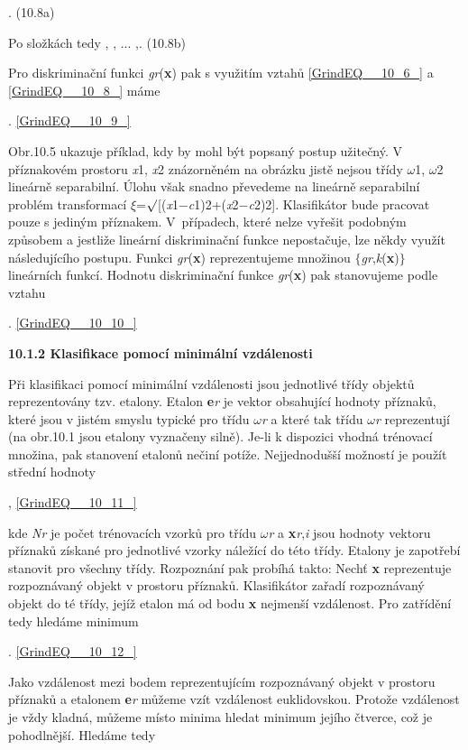  . (10.8a)

\noindent Po složkách tedy ,   ,  ...   ,. (10.8b)

\noindent Pro diskriminační funkci \textit{gr}(\textbf{x}) pak s využitím vztahů \eqref{GrindEQ__10_6_} a \eqref{GrindEQ__10_8_} máme

 . \eqref{GrindEQ__10_9_}

\noindent 

\noindent Obr.10.5 ukazuje příklad, kdy by mohl být popsaný postup užitečný. V příznakovém prostoru \textit{x}1, \textit{x}2 znázorněném na obrázku jistě nejsou třídy $\omega$1, $\omega$2 lineárně separabilní. Úlohu však snadno převedeme na lineárně separabilní problém transformací $\xi$=$\surd$[(\textit{x}1$-$\textit{c}1)2+(\textit{x}2$-$\textit{c}2)2]. Klasifikátor bude pracovat pouze s jediným příznakem. V~případech, které nelze vyřešit podobným způsobem a jestliže lineární diskriminační funkce nepostačuje, lze někdy využít následujícího postupu. Funkci \textit{gr}(\textbf{x}) reprezentujeme množinou $\{$\textit{gr},\textit{k}(\textbf{x})$\}$ lineárních funkcí. Hodnotu diskriminační funkce \textit{gr}(\textbf{x}) pak stanovujeme podle vztahu

 . \eqref{GrindEQ__10_10_}

\noindent \textbf{10.1.2 Klasifikace pomocí minimální vzdálenosti}

\noindent Při klasifikaci pomocí minimální vzdálenosti jsou jednotlivé třídy objektů reprezentovány tzv. etalony. Etalon \textbf{e}\textit{r} je vektor obsahující hodnoty příznaků, které jsou v jistém smyslu typické pro třídu $\omega$\textit{r} a které tak třídu $\omega$\textit{r} reprezentují (na obr.10.1 jsou etalony vyznačeny silně). Je-li k dispozici vhodná trénovací množina, pak stanovení etalonů nečiní potíže. Nejjednodušší možností je použít střední hodnoty

 , \eqref{GrindEQ__10_11_}

\noindent kde \textit{Nr} je počet trénovacích vzorků pro třídu $\omega$\textit{r} a \textbf{x}\textit{r},\textit{i} jsou hodnoty vektoru příznaků získané pro jednotlivé vzorky náležící do této třídy. Etalony je zapotřebí stanovit pro všechny třídy. Rozpoznání pak probíhá takto: Nechť \textbf{x} reprezentuje rozpoznávaný objekt v prostoru příznaků. Klasifikátor zařadí rozpoznávaný objekt do té třídy, jejíž etalon má od bodu \textbf{x} nejmenší vzdálenost. Pro zatřídění tedy hledáme minimum

 . \eqref{GrindEQ__10_12_}

\noindent Jako vzdálenost mezi bodem reprezentujícím rozpoznávaný objekt v prostoru příznaků a etalonem \textbf{e}\textit{r} můžeme vzít vzdálenost euklidovskou. Protože vzdálenost je vždy kladná, můžeme místo minima hledat minimum jejího čtverce, což je pohodlnější. Hledáme tedy

